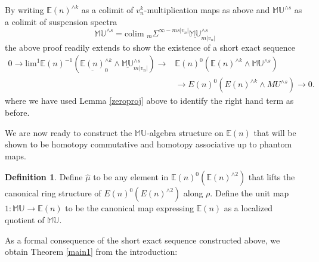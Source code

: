 \documentclass[12pt]{amsart}
\numberwithin{equation}{section}
\theoremstyle{plain}  %
\theoremstyle{definition}  %
\newtheorem{defn}[equation]{Definition}
\newcommand{\colim}{\text{colim }}
\newcommand{\MU}{\mathbb {MU}}
\newcommand{\E}{\mathbb{E}}
\begin{document}
By writing $\E(n)^{\wedge k}$ as a colimit of $v_n^k$-multiplication maps as above and $\MU^{\wedge s}$ as a colimit of suspension spectra 
$$\MU^{\wedge s}=\colim_m\Sigma^{\infty-ms|v_n|}\underline{\MU}_{m|v_n|}^{\wedge s}$$
the above proof readily extends to show the existence of a short exact sequence
\begin{align}\label{ses2} 0 \longrightarrow \text{lim}^1 \E(n)^{-1} (\underline{\E(n)}_0^{\wedge k} \wedge \underline{\MU}_{m|v_n|}^{\wedge s})  \longrightarrow &\E(n)^0(\E(n)^{\wedge k} \wedge \MU^{\wedge s})& \\
 \quad \quad \quad \quad \quad \quad \quad \quad &\longrightarrow E(n)^0(E(n)^{\wedge k} \wedge MU^{\wedge s}) \longrightarrow 0. \nonumber \end{align}
where we have used Lemma \ref{zeroproj} above to identify the right hand term as before.
\medskip
\noindent

We are now ready to construct the $\MU$-algebra structure on $\E(n)$ that will be shown to be homotopy commutative and homotopy associative up to phantom maps. 

\medskip
\begin{defn} \label{ring structure}
Define $\hat{\mu}$ to be any element in $\E(n)^0(\E(n)^{\wedge 2})$ that lifts the canonical ring structure of $E(n)^0(E(n)^{\wedge 2})$ along $\rho$. Define the unit map $1 : \MU \longrightarrow \E(n)$ to be the canonical map expressing $\E(n)$ as a localized quotient of $\MU$. 
\end{defn}

\medskip
\noindent
As a formal consequence of the short exact sequence constructed above, we obtain Theorem \ref{main1} from the introduction:
\end{document}
